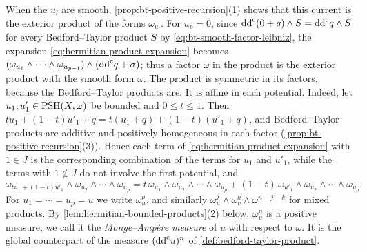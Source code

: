 When the $u_l$ are smooth, \cref{prop:bt-positive-recursion}(1) shows that this current is the exterior product of the forms $\omega_{u_l}$. For $u_p=0$, since $\mathrm{dd}^{\mathrm{c}}(0+q)\wedge S=\mathrm{dd}^{\mathrm{c}} q\wedge S$ for every Bedford--Taylor product $S$ by \eqref{eq:bt-smooth-factor-leibniz}, the expansion \eqref{eq:hermitian-product-expansion} becomes $(\omega_{u_1}\wedge\cdots\wedge\omega_{u_{p-1}})\wedge(\mathrm{dd}^{\mathrm{c}} q+\sigma)$; thus a factor $\omega$ in the product is the exterior product with the smooth form $\omega$. The product is symmetric in its factors, because the Bedford--Taylor products are. It is affine in each potential. Indeed, let $u_1,u'_1\in\mathrm{PSH}(X,\omega)$ be bounded and $0\leq t\leq1$. Then $tu_1+(1-t)u'_1+q=t(u_1+q)+(1-t)(u'_1+q)$, and Bedford--Taylor products are additive and positively homogeneous in each factor (\cref{prop:bt-positive-recursion}(3)). Hence each term of \eqref{eq:hermitian-product-expansion} with $1\in J$ is the corresponding combination of the terms for $u_1$ and $u'_1$, while the terms with $1\notin J$ do not involve the first potential, and
\[
 \omega_{tu_1+(1-t)u'_1}\wedge\omega_{u_2}\wedge\cdots\wedge\omega_{u_p}
 =t\,\omega_{u_1}\wedge\omega_{u_2}\wedge\cdots\wedge\omega_{u_p}
  +(1-t)\,\omega_{u'_1}\wedge\omega_{u_2}\wedge\cdots\wedge\omega_{u_p}.
\]
For $u_1=\cdots=u_p=u$ we write $\omega_u^p$, and similarly $\omega_u^j\wedge\omega_v^k\wedge\omega^{n-j-k}$ for mixed products. By \cref{lem:hermitian-bounded-products}(2) below, $\omega_u^n$ is a positive measure; we call it the \emph{Monge--Amp\`ere measure} of $u$ with respect to $\omega$. It is the global counterpart of the measure $(\mathrm{dd}^{\mathrm{c}} u)^n$ of \cref{def:bedford-taylor-product}.

